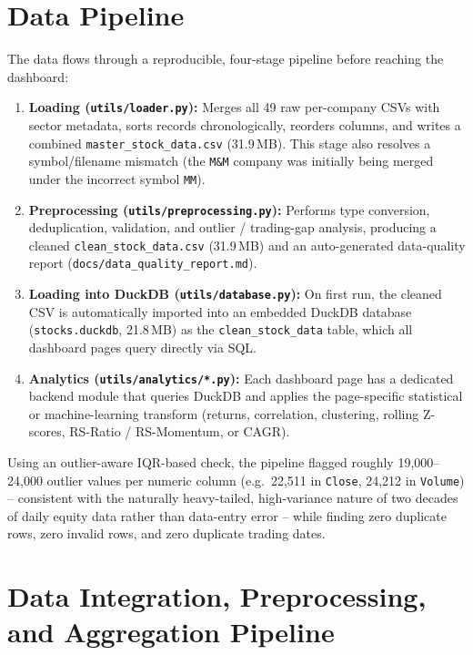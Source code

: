 \documentclass[14pt,a4paper]{extreport}
\begin{document}
\section{Data Pipeline}

The data flows through a reproducible, four-stage pipeline before reaching
the dashboard:

\begin{enumerate}
    \item \textbf{Loading (\texttt{utils/loader.py}):} Merges all 49 raw
        per-company CSVs with sector metadata, sorts records chronologically,
        reorders columns, and writes a combined \texttt{master\_stock\_data.csv}
        (31.9\,MB). This stage also resolves a symbol/filename mismatch
        (the \texttt{M\&M} company was initially being merged under the
        incorrect symbol \texttt{MM}).
    \item \textbf{Preprocessing (\texttt{utils/preprocessing.py}):}
        Performs type conversion, deduplication, validation, and outlier /
        trading-gap analysis, producing a cleaned \texttt{clean\_stock\_data.csv}
        (31.9\,MB) and an auto-generated data-quality report
        (\texttt{docs/data\_quality\_report.md}).
    \item \textbf{Loading into DuckDB (\texttt{utils/database.py}):} On
        first run, the cleaned CSV is automatically imported into an
        embedded DuckDB database (\texttt{stocks.duckdb}, 21.8\,MB) as the
        \texttt{clean\_stock\_data} table, which all dashboard pages query
        directly via SQL.
    \item \textbf{Analytics (\texttt{utils/analytics/*.py}):} Each dashboard
        page has a dedicated backend module that queries DuckDB and applies
        the page-specific statistical or machine-learning transform
        (returns, correlation, clustering, rolling Z-scores, RS-Ratio /
        RS-Momentum, or CAGR).
\end{enumerate}

Using an outlier-aware IQR-based check, the pipeline flagged roughly
19{,}000--24{,}000 outlier values per numeric column (e.g.\ 22{,}511 in
\texttt{Close}, 24{,}212 in \texttt{Volume}) -- consistent with the
naturally heavy-tailed, high-variance nature of two decades of daily equity
data rather than data-entry error -- while finding zero duplicate rows,
zero invalid rows, and zero duplicate trading dates.

\section{Data Integration, Preprocessing, and Aggregation Pipeline}
\end{document}
